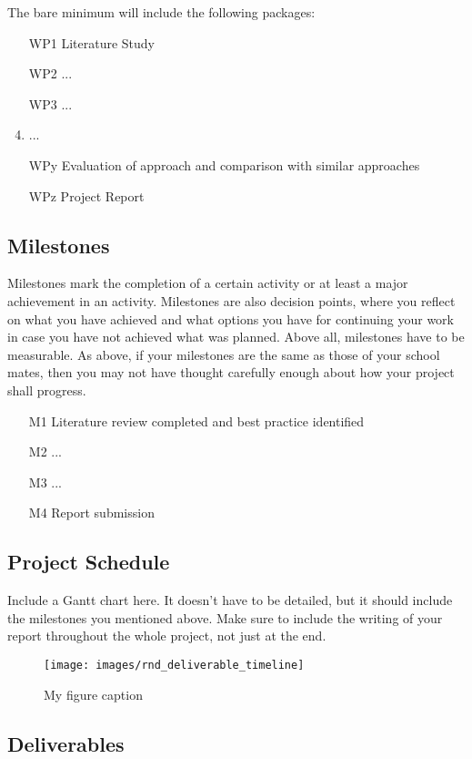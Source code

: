 \documentclass[thesis]{mas_proposal}
\begin{document}
The bare minimum will include the following packages:
\begin{enumerate}
    \item[WP1] Literature Study
    \item[WP2] ...
    \item[WP3] ...
    \item  ...
    \item[WPy] Evaluation of approach and comparison with similar approaches
    \item[WPz] Project Report
\end{enumerate}

\subsection{Milestones}
Milestones mark the completion of a certain activity or at least a major achievement in an activity. Milestones are also decision points, where you reflect on what you have achieved and what options you have for continuing your work in case you have not achieved what was planned. Above all, milestones have to be measurable. As above, if your milestones are the same as those of your school mates, then you may not have thought carefully enough about how your project shall progress.
\begin{enumerate}
    \item[M1] Literature review completed and best practice identified
    \item[M2] ...
    \item[M3] ...
    \item[M4] Report submission
\end{enumerate}

\subsection{Project Schedule}
Include a Gantt chart here. It doesn't have to be detailed, but it should include the milestones you mentioned above.
Make sure to include the writing of your report throughout the whole project, not just at the end.

\begin{figure}[h!]
    \texttt{[image: images/rnd\_deliverable\_timeline]}
    \caption{My figure caption}
    \label{fig:myfigure}
\end{figure}

\subsection{Deliverables}
\end{document}
